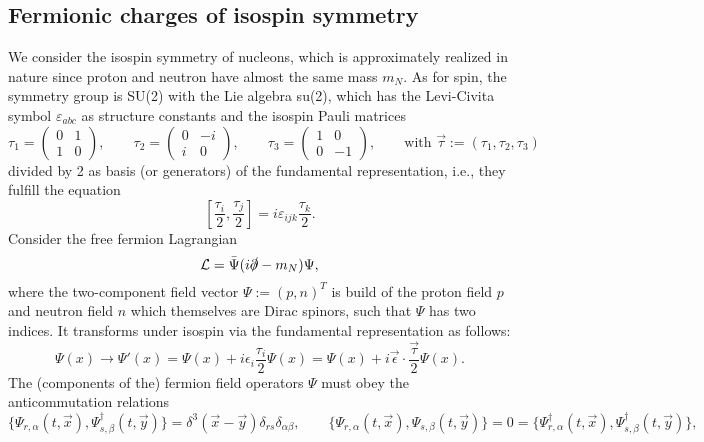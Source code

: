 \documentclass[11pt]{latex/exercise}
\begin{document}
\subsection{Fermionic charges of isospin symmetry}
\noindent
We consider the isospin symmetry of nucleons, which is approximately realized in nature since proton and neutron have almost the same mass $m_N$.
As for spin, the symmetry group is SU(2) with the Lie algebra su(2), which has the Levi-Civita symbol $\varepsilon_{abc}$ as structure constants and the isospin Pauli matrices
\begin{equation}
    \tau_1 = \begin{pmatrix} 0&1\\ 1&0 \end{pmatrix}, \qquad
    \tau_2 = \begin{pmatrix} 0&-i\\ i&0 \end{pmatrix}, \qquad
    \tau_3 = \begin{pmatrix} 1&0\\ 0&-1 \end{pmatrix}, \qquad
    \text{with } \vec{\tau} := (\tau_1, \tau_2, \tau_3)
\end{equation}
divided by 2 as basis (or generators) of the fundamental representation, i.e., they fulfill the equation
\begin{equation}
    \left[ \frac{\tau_i}{2}, \frac{\tau_j}{2} \right] = i \varepsilon_{ijk} \frac{\tau_k}{2} .
\end{equation}
Consider the free fermion Lagrangian
\begin{equation}
    \mathcal{L} = \bar\Psi ( i \slashed{\partial} - m_N ) \Psi ,
\end{equation}
where the two-component field vector $\Psi := (p,n)^T$ is build of the proton field $p$ and neutron field $n$ which themselves are Dirac spinors, such that $\Psi$ has two indices. It transforms under isospin via the fundamental representation as follows:
\begin{equation}
    \label{eq:transformation_isospin}
    \Psi(x) \rightarrow \Psi'(x) = \Psi(x) + i \epsilon_i \frac{\tau_i}{2} \Psi(x) = \Psi(x) + i \vec\epsilon \cdot \frac{\vec\tau}{2} \Psi(x) .
\end{equation}
The (components of the) fermion field operators $\Psi$ must obey the anticommutation relations
\begin{equation}
    \label{eq:equ-time_commutation_fermions}
    \{\Psi_{r,\alpha}(t,\vec x), \Psi_{s,\beta}^\dagger(t,\vec y)\} = \delta^3(\vec x - \vec y) \delta_{rs} \delta_{\alpha\beta} , \qquad
    \{\Psi_{r,\alpha}(t,\vec x), \Psi_{s,\beta}(t,\vec y)\} = 0 = \{\Psi_{r,\alpha}^\dagger(t,\vec x), \Psi_{s,\beta}^\dagger(t,\vec y)\} ,
\end{equation}
\end{document}

